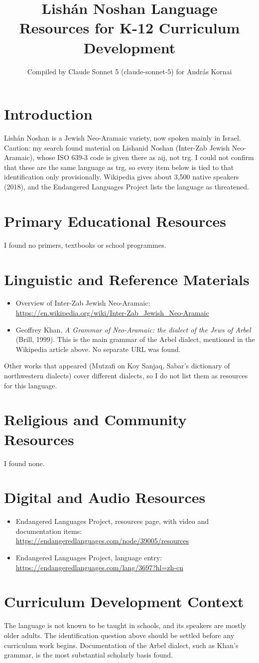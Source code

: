 \documentclass[12pt]{article}
\title{Lish\'an Noshan Language Resources for K-12 Curriculum Development}
\author{Compiled by Claude Sonnet 5 (claude-sonnet-5) for Andr\'as Kornai}
\date{}
\begin{document}
\maketitle
\section{Introduction}
Lish\'an Noshan is a Jewish Neo-Aramaic variety, now spoken mainly in Israel. Caution: my search found material on Lishanid Noshan (Inter-Zab Jewish Neo-Aramaic), whose ISO 639-3 code is given there as aij, not trg. I could not confirm that these are the same language as trg, so every item below is tied to that identification only provisionally. Wikipedia gives about 3,500 native speakers (2018), and the Endangered Languages Project lists the language as threatened.
\section{Primary Educational Resources}
I found no primers, textbooks or school programmes.
\section{Linguistic and Reference Materials}
\begin{itemize}
\item Overview of Inter-Zab Jewish Neo-Aramaic: \url{https://en.wikipedia.org/wiki/Inter-Zab_Jewish_Neo-Aramaic}
\item Geoffrey Khan, \emph{A Grammar of Neo-Aramaic: the dialect of the Jews of Arbel} (Brill, 1999). This is the main grammar of the Arbel dialect, mentioned in the Wikipedia article above. No separate URL was found.
\end{itemize}
Other works that appeared (Mutzafi on Koy Sanjaq, Sabar's dictionary of northwestern dialects) cover different dialects, so I do not list them as resources for this language.
\section{Religious and Community Resources}
I found none.
\section{Digital and Audio Resources}
\begin{itemize}
\item Endangered Languages Project, resources page, with video and documentation items: \url{https://endangeredlanguages.com/node/39005/resources}
\item Endangered Languages Project, language entry: \url{https://endangeredlanguages.com/lang/3697?hl=zh-cn}
\end{itemize}
\section{Curriculum Development Context}
The language is not known to be taught in schools, and its speakers are mostly older adults. The identification question above should be settled before any curriculum work begins. Documentation of the Arbel dialect, such as Khan's grammar, is the most substantial scholarly basis found.
\end{document}
